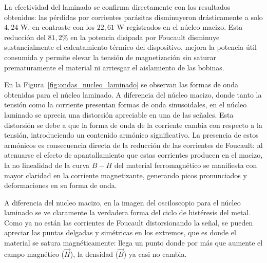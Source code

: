 La efectividad del laminado se confirma directamente con los resultados obtenidos: las pérdidas por corrientes parásitas disminuyeron drásticamente a solo $4,24\text{ W}$, en contraste con los $22,61\text{ W}$ registrados en el núcleo macizo. Esta reducción del $81,2\%$ en la potencia disipada por Foucault disminuye sustancialmente el calentamiento térmico del dispositivo, mejora la potencia útil consumida y permite elevar la tensión de magnetización sin saturar prematuramente el material ni arriesgar el aislamiento de las bobinas.

En la Figura~\ref{fig:ondas_nucleo_laminado} se observan las formas de onda obtenidas para el núcleo laminado. A diferencia del núcleo macizo, donde tanto la tensión como la corriente presentan formas de onda sinusoidales, en el núcleo laminado se aprecia una distorsión apreciable en una de las señales. Esta distorsión se debe a que la forma de onda de la corriente cambia con respecto a la tensión, introduciendo un contenido armónico significativo. La presencia de estos armónicos es consecuencia directa de la reducción de las corrientes de Foucault: al atenuarse el efecto de apantallamiento que estas corrientes producen en el macizo, la no linealidad de la curva $B-H$ del material ferromagnético se manifiesta con mayor claridad en la corriente magnetizante, generando picos pronunciados y deformaciones en su forma de onda.

A diferencia del nucleo macizo, en la imagen del osciloscopio para el núcleo laminado se ve claramente la verdadera forma del ciclo de histéresis del metal. Como ya no están las corrientes de Foucault distorsionando la señal, se pueden apreciar las puntas delgadas y simétricas en los extremos, que es donde el material se satura magnéticamente: llega un punto donde por más que aumente el campo magnético ($\vec{H}$), la densidad ($\vec{B}$) ya casi no cambia.
